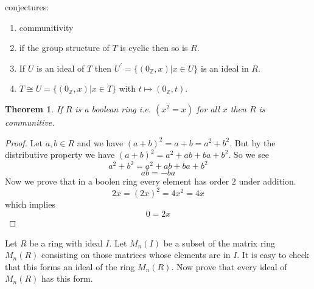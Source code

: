 \documentclass[11pt,largemargins]{homework}
\newcommand{\Z}{\mathbb{Z}}
\newtheorem{theorem}{Theorem}
\begin{document}
conjectures:
\begin{enumerate}
    \item communitivity
    \item if the group structure of $T$ is cyclic then so is $R$. 
    \item If $U$ is an ideal of $T$ then $U^\prime = \{ (0_\Z, x) | x \in U \} $ is an ideal in $R$.
    \item $T \cong U = \{(0_\Z, x)|x \in T \}$ with $t \mapsto (0_\Z, t)$. 
   
\end{enumerate}


\begin{theorem}
    If $R$ is a boolean ring i.e. $(x^2 = x)$ for all $x$ then $R$ is communitive.
\end{theorem}

\begin{proof}
    Let $a, b \in R$ and we have $(a + b)^2 = a + b = a^2 + b^2$. But by the distributive
    property we have $(a + b )^2 = a^2 + ab + ba + b^2$. So we see 
    \[a^2 + b^2 = a^2 + ab + ba + b^2\]
    \[ab = - ba \] 
    Now we prove that in a boolen ring every element has order 2 under addition. 
    \[2x = (2x)^2 = 4x^2 = 4x\]
    which implies 
    \[ 0 = 2x\]
\end{proof}

Let $R$ be a ring with ideal $I$. Let $M_n(I)$ be a subset of the matrix ring $M_n(R)$ consisting on those matrices 
whose elements are in $I$. It is easy to check that this forms an ideal of the ring $M_n(R)$. Now prove that every
ideal of $M_n(R)$ has this form. 
\end{document}
